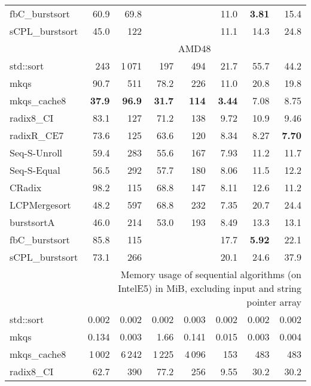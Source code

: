 \documentclass[a4paper]{myjournal}
\begin{document}
\begin{table}[p]
\begin{tabular}{l|rrrr*{3}{r}|}
  fbC\_burstsort &     60.9 &     69.8 &          &          &     11.0 & \bf 3.81 &     15.4 \\
 sCPL\_burstsort &     45.0 &      122 &          &          &     11.1 &     14.3 &     24.8 \\ \hline
& \multicolumn{7}{c|}{AMD48} \\ \cline{2-8}
std::sort &      243 &   1\,071 &      197 &     494 &     21.7 &     55.7 &     44.2 \\
            mkqs &     90.7 &      511 &     78.2 &     226 &     11.0 &     20.8 &     19.8 \\
    mkqs\_cache8 & \bf 37.9 & \bf 96.9 & \bf 31.7 & \bf 114 & \bf 3.44 &     7.08 &     8.75 \\
      radix8\_CI &     83.1 &      127 &     71.2 &     138 &     9.72 &     10.9 &     9.46 \\
     radixR\_CE7 &     73.6 &      125 &     63.6 &     120 &     8.34 &     8.27 & \bf 7.70 \\
Seq-S-Unroll &     59.4 &      283 &     55.6 &     167 &     7.93 &     11.2 &     11.7 \\
 Seq-S-Equal &     56.5 &      292 &     57.7 &     180 &     8.06 &     11.5 &     12.2 \\
          CRadix &     98.2 &      115 &     68.8 &     147 &     8.11 &     12.6 &     11.2 \\
    LCPMergesort &     48.2 &      597 &     68.8 &     232 &     7.35 &     20.7 &     24.4 \\
      burstsortA &     46.0 &      214 &     53.0 &     193 &     8.49 &     13.3 &     13.1 \\
  fbC\_burstsort &     85.8 &      115 &          &         &     17.7 & \bf 5.92 &     22.1 \\
 sCPL\_burstsort &     73.1 &      266 &          &         &     20.1 &     24.6 &     37.9 \\ \hline
& \multicolumn{7}{p{76ex}|}{\centering{}Memory usage of sequential algorithms (on IntelE5) in MiB, excluding input and string pointer array} \\ \cline{2-8}
std::sort &   0.002 &  0.002 &  0.002 &  0.003 &  0.002 &  0.002 &  0.002 \\
            mkqs &   0.134 &  0.003 &   1.66 &  0.141 &  0.015 &  0.003 &  0.004 \\
    mkqs\_cache8 &  1\,002 & 6\,242 & 1\,225 & 4\,096 &    153 &    483 &    483 \\
      radix8\_CI &    62.7 &    390 &   77.2 &    256 &   9.55 &   30.2 &   30.2 \\

\end{tabular}
\end{table}
\end{document}
